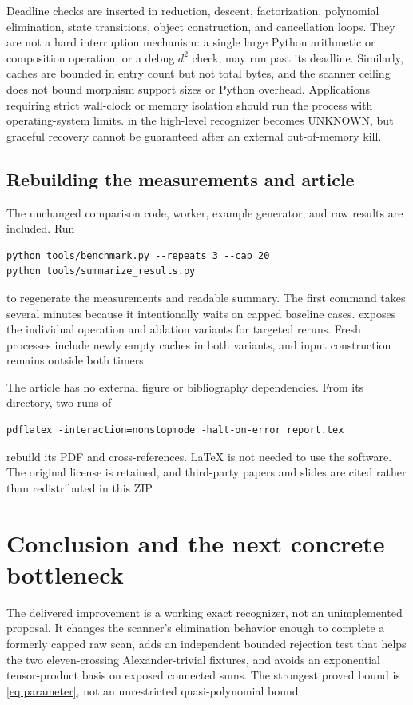\documentclass[11pt]{article}
\theoremstyle{definition}\newtheorem{definition}[theorem]{Definition}
\theoremstyle{remark}\newtheorem{remark}[theorem]{Remark}
\newcommand{\code}[1]{\texttt{\detokenize{#1}}}
\newcommand{\UNKNOWN}{\textsf{UNKNOWN}}
\begin{document}
Deadline checks are inserted in reduction, descent, factorization, polynomial
elimination, state transitions, object construction, and cancellation loops.
They are not a hard interruption mechanism: a single large Python arithmetic
or composition operation, or a debug $d^2$ check, may run past its deadline.
Similarly, caches are bounded in entry count but not total bytes, and the
scanner ceiling does not bound morphism support sizes or Python overhead.
Applications requiring strict wall-clock or memory isolation should run the
process with operating-system limits. \code{MemoryError} in the high-level
recognizer becomes \UNKNOWN, but graceful recovery cannot be guaranteed after
an external out-of-memory kill.

\subsection{Rebuilding the measurements and article}

The unchanged comparison code, worker, example generator, and raw results are
included. Run
\begin{lstlisting}
python tools/benchmark.py --repeats 3 --cap 20
python tools/summarize_results.py
\end{lstlisting}
to regenerate the measurements and readable summary. The first command takes
several minutes because it intentionally waits on capped baseline cases.
\code{benchmark_worker.py} exposes the individual operation and ablation
variants for targeted reruns. Fresh processes include newly empty caches in
both variants, and input construction remains outside both timers.

The article has no external figure or bibliography dependencies. From its
\code{docs/} directory, two runs of
\begin{lstlisting}
pdflatex -interaction=nonstopmode -halt-on-error report.tex
\end{lstlisting}
rebuild its PDF and cross-references. LaTeX is not needed to use the software.
The original license is retained, and third-party papers and slides are
cited rather than redistributed in this ZIP.

\section{Conclusion and the next concrete bottleneck}

The delivered improvement is a working exact recognizer, not an unimplemented
proposal. It changes the scanner's elimination behavior enough to complete a
formerly capped raw scan, adds an independent bounded rejection test that
helps the two eleven-crossing Alexander-trivial fixtures, and avoids an
exponential tensor-product basis on exposed connected sums. The strongest
proved bound is \eqref{eq:parameter}, not an unrestricted quasi-polynomial
bound.
\end{document}
